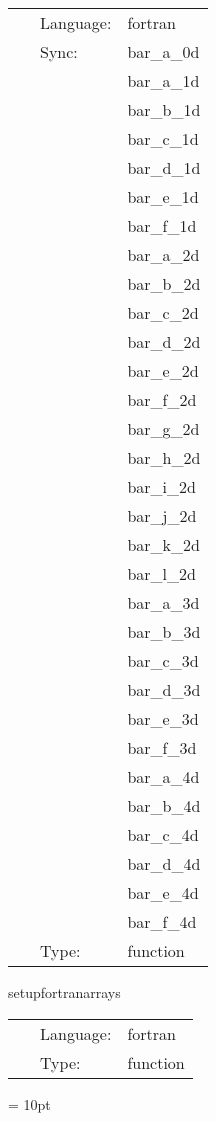 \hspace{5mm}

 \begin{tabular*}{160mm}{cll} 
~ & Language:  & fortran \\ 
~ & Sync:  & bar\_a\_0d \\ 
~& ~ &bar\_a\_1d\\ 
~& ~ &bar\_b\_1d\\ 
~& ~ &bar\_c\_1d\\ 
~& ~ &bar\_d\_1d\\ 
~& ~ &bar\_e\_1d\\ 
~& ~ &bar\_f\_1d\\ 
~& ~ &bar\_a\_2d\\ 
~& ~ &bar\_b\_2d\\ 
~& ~ &bar\_c\_2d\\ 
~& ~ &bar\_d\_2d\\ 
~& ~ &bar\_e\_2d\\ 
~& ~ &bar\_f\_2d\\ 
~& ~ &bar\_g\_2d\\ 
~& ~ &bar\_h\_2d\\ 
~& ~ &bar\_i\_2d\\ 
~& ~ &bar\_j\_2d\\ 
~& ~ &bar\_k\_2d\\ 
~& ~ &bar\_l\_2d\\ 
~& ~ &bar\_a\_3d\\ 
~& ~ &bar\_b\_3d\\ 
~& ~ &bar\_c\_3d\\ 
~& ~ &bar\_d\_3d\\ 
~& ~ &bar\_e\_3d\\ 
~& ~ &bar\_f\_3d\\ 
~& ~ &bar\_a\_4d\\ 
~& ~ &bar\_b\_4d\\ 
~& ~ &bar\_c\_4d\\ 
~& ~ &bar\_d\_4d\\ 
~& ~ &bar\_e\_4d\\ 
~& ~ &bar\_f\_4d\\ 
~ & Type:  & function \\ 
\end{tabular*} 


\vspace{5mm}


\hspace{5mm} setupfortranarrays 

\hspace{5mm}{\it set up  fortran arrays } 


\hspace{5mm}

 \begin{tabular*}{160mm}{cll} 
~ & Language:  & fortran \\ 
~ & Type:  & function \\ 
\end{tabular*} 



\vspace{5mm}\parskip = 10pt 
